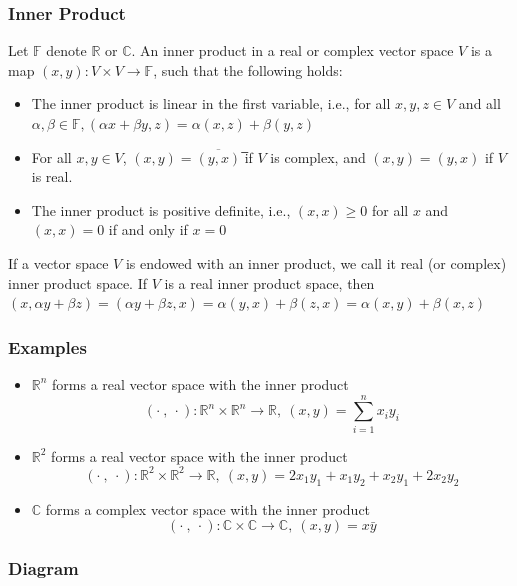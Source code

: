 \documentclass{beamer}
\newcommand{\R}{\mathbb{R}}
\begin{document}
\begin{frame}
    \frametitle{Inner Product }
    Let $\mathbb{F}$ denote $\mathbb{R}$ or $\mathbb{C}$. An inner product in a real or complex vector space
    $V$ is a map $(x,y):V \times V \to \mathbb{F}$, such that the following holds:
    \begin{itemize}
        \item The inner product is linear in the first variable, i.e., for all $x, y, z \in V$ and all $\alpha, \beta \in \mathbb{F}, (\alpha x+\beta y,z)=\alpha(x,z)+\beta(y,z)$
        \item For all $x,y \in V$, $(x,y)=\overline{(y,x)}$ ̅if $V$ is complex,  and $(x,y)=(y,x)$ if $V$ is real.
        \item The inner product is positive definite, i.e., $(x,x)\geq 0$ for all $x$ and $(x,x)=0$ if and only if $x=0$
    \end{itemize}
    If a vector space $V$ is endowed with an inner product, we call it real
    (or complex) inner product space. If $V$ is a real inner product space,
    then $(x, \alpha y+\beta z)=(\alpha y+\beta z,x)=\alpha(y,x)+\beta (z,x)=\alpha (x,y)+\beta (x,z)$

\end{frame}

\begin{frame}
    \frametitle{Examples}
    \begin{itemize}
        \item $\mathbb{R}^n$ forms a real vector space with the inner product $$(\cdot~, ~\cdot):\R ^n \times \R^n \to \R ,~ (x,y)=\sum_{i=1}^n x_i y_i $$
        \item $\mathbb{R}^2$ forms a real vector space with the inner product $$(\cdot~, ~\cdot):\R^2 \times \R^2\to \R ,~ (x,y)=2x_1 y_1+x_1 y_2+x_2 y_1+2x_2 y_2$$
        \item $\mathbb{C}$ forms a complex vector space with the inner product $$(\cdot~, ~\cdot):\mathbb{C} \times \mathbb{C}\to \mathbb{C}, ~(x,y)=x \bar{y}$$
    \end{itemize}

\end{frame}

\begin{frame}
    \frametitle{Diagram}
    \begin{figure}
    \end{figure}


\end{frame}
\end{document}
